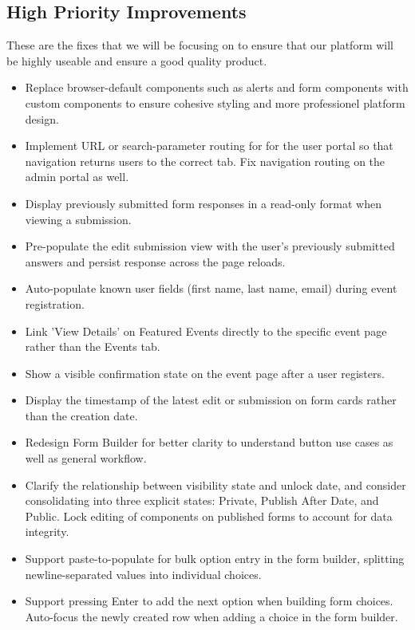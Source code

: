 \documentclass[12pt]{article}
\begin{document}
\subsection{High Priority Improvements}
These are the fixes that we will be focusing on to ensure that our platform will be highly useable and ensure a good quality product.
\begin{itemize}
    \item Replace browser-default components such as alerts and form components with custom components to ensure cohesive styling and more professionel platform design.
    \item Implement URL or search-parameter routing for for the user portal so that navigation returns users to the correct tab. Fix navigation routing on the admin portal as well.
    \item Display previously submitted form responses in a read-only format when viewing a submission.
    \item Pre-populate the edit submission view with the user's previously submitted answers and persist response across the page reloads.
    \item Auto-populate known user fields (first name, last name, email) during event registration.
    \item Link 'View Details' on Featured Events directly to the specific event page rather than the Events tab.
    \item Show a visible confirmation state on the event page after a user registers.
    \item Display the timestamp of the latest edit or submission on form cards rather than the creation date.
    \item Redesign Form Builder for better clarity to understand button use cases as well as general workflow.
    \item Clarify the relationship between visibility state and unlock date, and consider consolidating into three explicit states: Private, Publish After Date, and Public. Lock editing of components on published forms to account for data integrity.
    \item Support paste-to-populate for bulk option entry in the form builder, splitting newline-separated values into individual choices.
    \item Support pressing Enter to add the next option when building form choices. Auto-focus the newly created row when adding a choice in the form builder.
\end{itemize}
\end{document}
